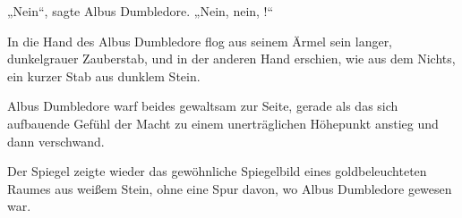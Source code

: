 „Nein“, sagte Albus Dumbledore.
„Nein, nein, !“

In die Hand des Albus Dumbledore flog aus seinem Ärmel sein langer, dunkelgrauer Zauberstab, und in der anderen Hand erschien, wie aus dem Nichts, ein kurzer Stab aus dunklem Stein.

Albus Dumbledore warf beides gewaltsam zur Seite, gerade als das sich aufbauende Gefühl der Macht zu einem unerträglichen Höhepunkt anstieg und dann verschwand.

Der Spiegel zeigte wieder das gewöhnliche Spiegelbild eines goldbeleuchteten Raumes aus weißem Stein, ohne eine Spur davon, wo Albus Dumbledore gewesen war.

